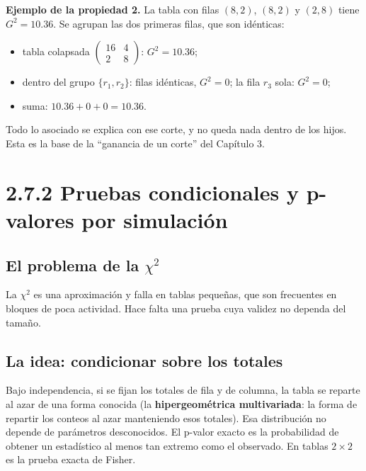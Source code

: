 \documentclass[11pt,a4paper]{article}
\begin{document}
\textbf{Ejemplo de la propiedad 2.} La tabla con filas $(8,2)$, $(8,2)$ y $(2,8)$
tiene $G^2=10.36$. Se agrupan las dos primeras filas, que son idénticas:
\begin{itemize}
  \item tabla colapsada $\begin{pmatrix}16&4\\2&8\end{pmatrix}$: $G^2=10.36$;
  \item dentro del grupo $\{r_1,r_2\}$: filas idénticas, $G^2=0$; la fila $r_3$
  sola: $G^2=0$;
  \item suma: $10.36+0+0=10.36$. \checkmark
\end{itemize}
Todo lo asociado se explica con ese corte, y no queda nada dentro de los hijos.
Esta es la base de la ``ganancia de un corte'' del Capítulo 3.

\section{2.7.2 Pruebas condicionales y p-valores por simulación}

\subsection{El problema de la $\chi^2$}

La $\chi^2$ es una aproximación y falla en tablas pequeñas, que son frecuentes en
bloques de poca actividad. Hace falta una prueba cuya validez no dependa del
tamaño.

\subsection{La idea: condicionar sobre los totales}

Bajo independencia, si se fijan los totales de fila y de columna, la tabla se
reparte al azar de una forma conocida (la \textbf{hipergeométrica multivariada}: la
forma de repartir los conteos al azar manteniendo esos totales). Esa distribución
no depende de parámetros desconocidos. El p-valor exacto es la probabilidad de
obtener un estadístico al menos tan extremo como el observado. En tablas
$2\times2$ es la prueba exacta de Fisher.
\end{document}
